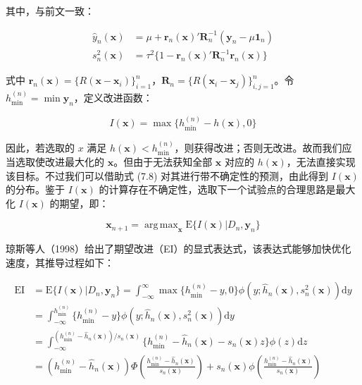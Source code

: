 \documentclass{ctexart}
\DeclareMathOperator*{\argmax}{arg\,max}
\begin{document}
其中，与前文一致：

\begin{align*}
\widehat{y}_n(\boldsymbol{x})&=\mu+\boldsymbol{r}_n(\boldsymbol{x})'\boldsymbol{R}_n^{-1}(\boldsymbol{y}_n-\mu\boldsymbol{1}_n)\\
s_n^2(\boldsymbol{x})&=\tau^2\{1-\boldsymbol{r}_n(\boldsymbol{x})'\boldsymbol{R}_n^{-1}\boldsymbol{r}_n(\boldsymbol{x})\}
\end{align*}

式中 $\boldsymbol{r}_n(\boldsymbol{x})=\{R(\boldsymbol{x}-\boldsymbol{x}_i)\}_{i=1}^n$，$\boldsymbol{R}_n=\{R(\boldsymbol{x}_i-\boldsymbol{x}_j)\}_{i,j=1}^n$。令 $h_{\mathrm{min}}^{(n)}=\min \boldsymbol{y}_n$，定义改进函数：

\begin{equation*}
I(\boldsymbol{x})=\max\{h_{\mathrm{min}}^{(n)}-h(\boldsymbol{x}),0\}
\end{equation*}

因此，若选取的 $x$ 满足 $h(\boldsymbol{x})<h_{\mathrm{min}}^{(n)}$，则获得改进；否则无改进。故而我们应当选取使改进最大化的 $\boldsymbol{x}$。但由于无法获知全部 $\boldsymbol{x}$ 对应的 $h(\boldsymbol{x})$，无法直接实现该目标。不过我们可以借助式 (7.8) 对其进行带不确定性的预测，由此得到 $I(\boldsymbol{x})$ 的分布。鉴于 $I(\boldsymbol{x})$ 的计算存在不确定性，选取下一个试验点的合理思路是最大化 $I(\boldsymbol{x})$ 的期望，即：

\begin{equation*}
\boldsymbol{x}_{n+1}=\argmax_{\boldsymbol{x}}\mathrm{E}\{I(\boldsymbol{x})\big|D_n,\boldsymbol{y}_n\}
\end{equation*}

琼斯等人（1998）给出了期望改进（EI）的显式表达式，该表达式能够加快优化速度，其推导过程如下：

\begin{align*}
\mathrm{EI}&=\mathrm{E}\{I(\boldsymbol{x})|D_n,\boldsymbol{y}_n\}=\int_{-\infty}^{\infty}\max\{h_{\mathrm{min}}^{(n)}-y,0\}\phi(y;\widehat{h}_n(\boldsymbol{x}),s^2_n(\boldsymbol{x}))\mathrm{d}y\\
&=\int_{-\infty}^{h_{\mathrm{min}}^{(n)}}\{h_{\mathrm{min}}^{(n)}-y\}\phi(y;\widehat{h}_n(\boldsymbol{x}),s^2_n(\boldsymbol{x}))\mathrm{d}y\\
&=\int_{-\infty}^{(h_{\mathrm{min}}^{(n)}-\widehat{h}_n(\boldsymbol{x}))/s_n(\boldsymbol{x})}\{h_{\mathrm{min}}^{(n)}-\widehat{h}_n(\boldsymbol{x})-s_n(\boldsymbol{x})z\}\phi(z)\mathrm{d}z\\
&=(h_{\mathrm{min}}^{(n)}-\widehat{h}_n(\boldsymbol{x}))\Phi\left(\frac{h_{\mathrm{min}}^{(n)}-\widehat{h}_n(\boldsymbol{x})}{s_n(\boldsymbol{x})}\right)+s_n(\boldsymbol{x})\phi\left(\frac{h_{\mathrm{min}}^{(n)}-\widehat{h}_n(\boldsymbol{x})}{s_n(\boldsymbol{x})}\right)
\end{align*}
\end{document}

